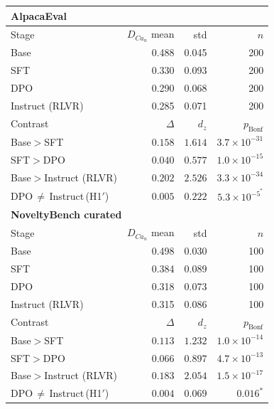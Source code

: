 \begin{tabular}{lrrr}
\toprule
\multicolumn{4}{l}{\textbf{AlpacaEval}} \\
\midrule
Stage & $D_{Ca_n}$ mean & std & $n$ \\
\quad Base & 0.488 & 0.045 & 200 \\
\quad SFT & 0.330 & 0.093 & 200 \\
\quad DPO & 0.290 & 0.068 & 200 \\
\quad Instruct (RLVR) & 0.285 & 0.071 & 200 \\
\addlinespace
Contrast & $\Delta$ & $d_z$ & $p_{\mathrm{Bonf}}$ \\
\quad Base$>$SFT & $0.158$ & $1.614$ & $3.7 \times 10^{-31}$ \\
\quad SFT$>$DPO & $0.040$ & $0.577$ & $1.0 \times 10^{-15}$ \\
\quad Base$>$Instruct (RLVR) & $0.202$ & $2.526$ & $3.3 \times 10^{-34}$ \\
\quad DPO$\,\neq\,$Instruct\,(H1$'$) & $0.005$ & $0.222$ & $5.3 \times 10^{-5}^{*}$ \\
\midrule
\multicolumn{4}{l}{\textbf{NoveltyBench curated}} \\
\midrule
Stage & $D_{Ca_n}$ mean & std & $n$ \\
\quad Base & 0.498 & 0.030 & 100 \\
\quad SFT & 0.384 & 0.089 & 100 \\
\quad DPO & 0.318 & 0.073 & 100 \\
\quad Instruct (RLVR) & 0.315 & 0.086 & 100 \\
\addlinespace
Contrast & $\Delta$ & $d_z$ & $p_{\mathrm{Bonf}}$ \\
\quad Base$>$SFT & $0.113$ & $1.232$ & $1.0 \times 10^{-14}$ \\
\quad SFT$>$DPO & $0.066$ & $0.897$ & $4.7 \times 10^{-13}$ \\
\quad Base$>$Instruct (RLVR) & $0.183$ & $2.054$ & $1.5 \times 10^{-17}$ \\
\quad DPO$\,\neq\,$Instruct\,(H1$'$) & $0.004$ & $0.069$ & $0.016^{*}$ \\
\bottomrule
\end{tabular}
